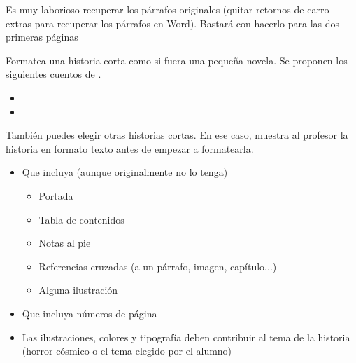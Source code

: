 \begin{Aviso}
   Es muy laborioso recuperar los párrafos originales (quitar retornos de carro extras para recuperar los párrafos en Word). Bastará con hacerlo para las dos primeras páginas
\end{Aviso}

\newpage

\begin{homeworkProblem}
  Formatea una historia corta como si fuera una pequeña novela. Se proponen los siguientes cuentos de . 
  \begin{itemize}
  \item {}
  \item {}
  \end{itemize}
  También puedes elegir otras historias cortas. En ese caso, muestra al profesor la historia en formato texto antes de empezar a formatearla.

  \begin{Aviso}

    \begin{itemize}
    \item Que incluya (aunque originalmente no lo tenga)
      \begin{itemize}
      \item Portada
      \item Tabla de contenidos
      \item Notas al pie
      \item Referencias cruzadas (a un párrafo, imagen, capítulo...)
      \item Alguna ilustración
      \end{itemize}
    \item Que incluya números de página
    \item Las ilustraciones, colores y tipografía deben contribuir al tema de la historia (horror cósmico o el tema elegido por el alumno)
    \end{itemize}
  \end{Aviso}
  
\end{homeworkProblem}




